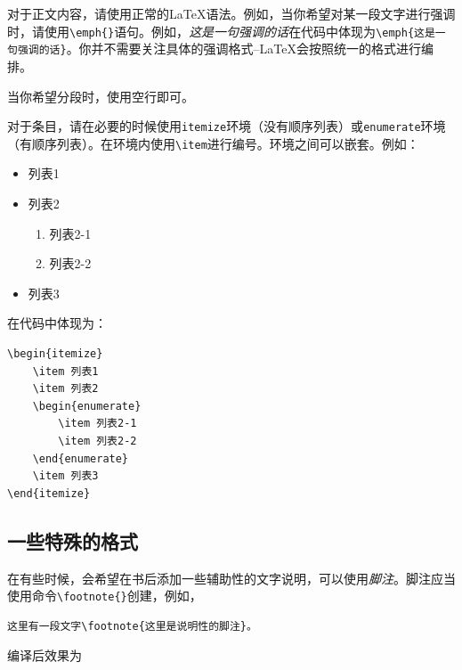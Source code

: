 对于正文内容，请使用正常的\LaTeX 语法。例如，当你希望对某一段文字进行强调时，请使用\verb|\emph{}|语句。例如，\emph{这是一句强调的话}在代码中体现为\verb|\emph{这是一句强调的话}|。你并不需要关注具体的强调格式--\LaTeX 会按照统一的格式进行编排。

当你希望分段时，使用空行即可。

对于条目，请在必要的时候使用\verb|itemize|环境（没有顺序列表）或\verb|enumerate|环境（有顺序列表）。在环境内使用\verb|\item|进行编号。环境之间可以嵌套。例如：

\begin{itemize}
    \item 列表1
    \item 列表2
    \begin{enumerate}
        \item 列表2-1
        \item 列表2-2
    \end{enumerate}
    \item 列表3
\end{itemize}

在代码中体现为：

\begin{lstlisting}[frame=line]
\begin{itemize}
    \item 列表1
    \item 列表2
    \begin{enumerate}
        \item 列表2-1
        \item 列表2-2
    \end{enumerate}
    \item 列表3
\end{itemize}
\end{lstlisting}

\subsection{一些特殊的格式}\label{subsec:关于如何使用LaTeX编写模板-一些特殊的格式}

在有些时候，会希望在书后添加一些辅助性的文字说明，可以使用\emph{脚注}。脚注应当使用命令\verb|\footnote{}|创建，例如，

\begin{lstlisting}[frame=line]
这里有一段文字\footnote{这里是说明性的脚注}。
\end{lstlisting}

编译后效果为


